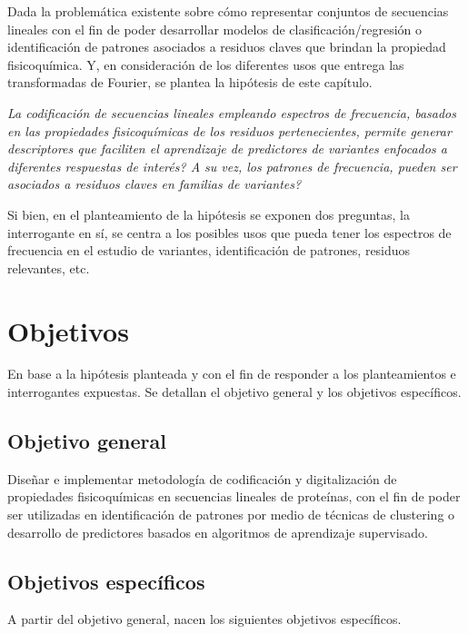 Dada la problemática existente sobre cómo representar conjuntos de secuencias lineales con el fin de poder desarrollar modelos de clasificación/regresión o identificación de patrones asociados a residuos claves que brindan la propiedad fisicoquímica. Y, en consideración de los diferentes usos que entrega las transformadas de Fourier, se plantea la hipótesis de este capítulo.

\begin{center}
	\textit{La codificación de secuencias lineales empleando espectros de frecuencia, basados en las propiedades fisicoquímicas de los residuos pertenecientes, permite generar descriptores que faciliten el aprendizaje de predictores de variantes enfocados a diferentes respuestas de interés? A su vez, los patrones de frecuencia, pueden ser asociados a residuos claves en familias de variantes?
}
\end{center}
Si bien, en el planteamiento de la hipótesis se exponen dos preguntas, la interrogante en sí, se centra a los posibles usos que pueda tener los espectros de frecuencia en el estudio de variantes, identificación de patrones, residuos relevantes, etc.

\section{Objetivos}

En base a la hipótesis planteada y con el fin de responder a los planteamientos e interrogantes expuestas. Se detallan el objetivo general y los objetivos específicos.

\subsection{Objetivo general}

Diseñar e implementar metodología de codificación y digitalización de propiedades fisicoquímicas en secuencias lineales de proteínas, con el fin de poder ser utilizadas en identificación de patrones por medio de técnicas de clustering o desarrollo de predictores basados en algoritmos de aprendizaje supervisado.

\subsection{Objetivos específicos}

A partir del objetivo general, nacen los siguientes objetivos específicos.


